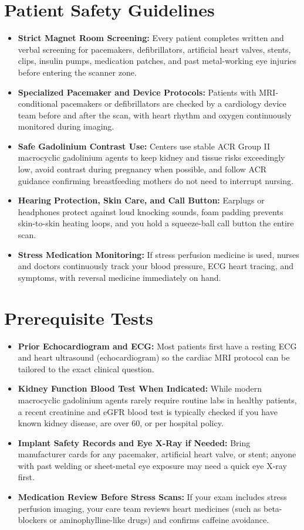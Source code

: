 \section{Patient Safety Guidelines}
\begin{itemize}
\item \textbf{Strict Magnet Room Screening:} Every patient completes written and verbal screening for pacemakers, defibrillators, artificial heart valves, stents, clips, insulin pumps, medication patches, and past metal-working eye injuries before entering the scanner zone.
\item \textbf{Specialized Pacemaker and Device Protocols:} Patients with MRI-conditional pacemakers or defibrillators are checked by a cardiology device team before and after the scan, with heart rhythm and oxygen continuously monitored during imaging.
\item \textbf{Safe Gadolinium Contrast Use:} Centers use stable ACR Group II macrocyclic gadolinium agents to keep kidney and tissue risks exceedingly low, avoid contrast during pregnancy when possible, and follow ACR guidance confirming breastfeeding mothers do not need to interrupt nursing.
\item \textbf{Hearing Protection, Skin Care, and Call Button:} Earplugs or headphones protect against loud knocking sounds, foam padding prevents skin-to-skin heating loops, and you hold a squeeze-ball call button the entire scan.
\item \textbf{Stress Medication Monitoring:} If stress perfusion medicine is used, nurses and doctors continuously track your blood pressure, ECG heart tracing, and symptoms, with reversal medicine immediately on hand.
\end{itemize}

\section{Prerequisite Tests}
\begin{itemize}
\item \textbf{Prior Echocardiogram and ECG:} Most patients first have a resting ECG and heart ultrasound (echocardiogram) so the cardiac MRI protocol can be tailored to the exact clinical question.
\item \textbf{Kidney Function Blood Test When Indicated:} While modern macrocyclic gadolinium agents rarely require routine labs in healthy patients, a recent creatinine and eGFR blood test is typically checked if you have known kidney disease, are over 60, or per hospital policy.
\item \textbf{Implant Safety Records and Eye X-Ray if Needed:} Bring manufacturer cards for any pacemaker, artificial heart valve, or stent; anyone with past welding or sheet-metal eye exposure may need a quick eye X-ray first.
\item \textbf{Medication Review Before Stress Scans:} If your exam includes stress perfusion imaging, your care team reviews heart medicines (such as beta-blockers or aminophylline-like drugs) and confirms caffeine avoidance.
\end{itemize}

